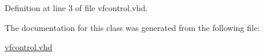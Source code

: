 \subsubsection[{S\+T\+D\+\_\+\+L\+O\+G\+I\+C\+\_\+\+U\+N\+S\+I\+G\+N\+E\+D}]{\hspace{0.3cm}{\ttfamily [Package]}}\label{classvfcontrol_a241c3e72dd8024cc8ae831b1b2aed7db}


Definition at line 3 of file vfcontrol.\+vhd.



The documentation for this class was generated from the following file\+:\begin{DoxyCompactItemize}
\item 
\hyperlink{vfcontrol_8vhd}{vfcontrol.\+vhd}\end{DoxyCompactItemize}
